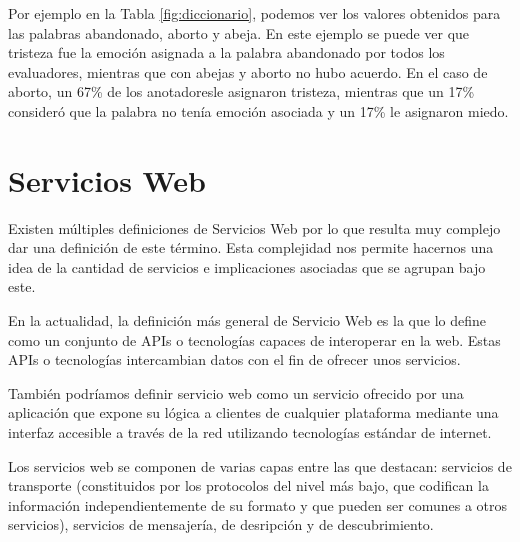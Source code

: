 Por ejemplo en la Tabla \ref{fig:diccionario}, podemos ver los valores obtenidos para las palabras abandonado, aborto y abeja. En este ejemplo se puede ver que tristeza fue la emoción asignada a la palabra abandonado por todos los evaluadores, mientras que con abejas y aborto no hubo acuerdo. En el caso de aborto, un 67\% de los anotadoresle asignaron tristeza, mientras que un 17\% consideró que la palabra no tenía emoción asociada y un 17\% le asignaron miedo.

\section{Servicios Web}
\label{cap2:sec:servicios_web}

	Existen múltiples definiciones de Servicios Web por lo que resulta muy complejo dar una definición de este término. Esta complejidad nos permite hacernos una idea de la cantidad de servicios e implicaciones asociadas que se agrupan bajo este.
	
	En la actualidad, la definición más general de Servicio Web es la que lo define como un conjunto de APIs o tecnologías capaces de interoperar en la web. Estas APIs o tecnologías intercambian datos con el fin de ofrecer unos servicios.
	
	También podríamos definir servicio web como un servicio ofrecido por una aplicación que expone su lógica a clientes de cualquier plataforma mediante una interfaz accesible a través de la red utilizando tecnologías estándar de internet.
	
	Los servicios web se componen de varias capas entre las que destacan: servicios de transporte (constituidos por los protocolos del nivel más bajo, que codifican la información independientemente de su formato y que pueden ser comunes a otros servicios), servicios de mensajería, de desripción y de descubrimiento.
	
